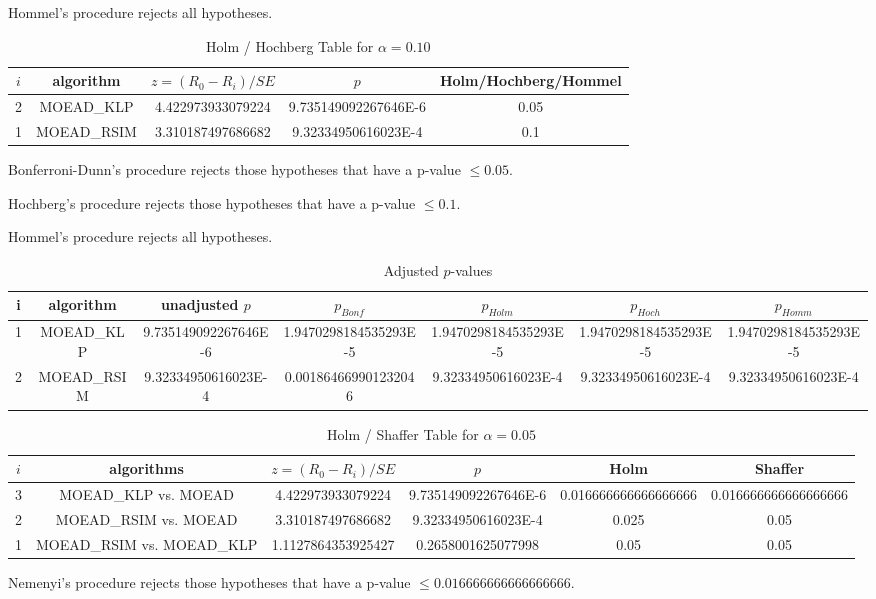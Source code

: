 \documentclass[a4paper,10pt]{article}
\begin{document}
\begin{landscape}
Hommel's procedure rejects all hypotheses.


\begin{table}[!htp]
\centering\tiny
\caption{Holm / Hochberg Table for $\alpha=0.10$}
\begin{tabular}{ccccc}
$i$&algorithm&$z=(R_0 - R_i)/SE$&$p$&Holm/Hochberg/Hommel\\
\hline
2&MOEAD_KLP&4.422973933079224&9.735149092267646E-6&0.05\\
1&MOEAD_RSIM&3.310187497686682&9.32334950616023E-4&0.1\\
\hline
\end{tabular}
\end{table}
Bonferroni-Dunn's procedure rejects those hypotheses that have a p-value $\le0.05$.


Hochberg's procedure rejects those hypotheses that have a p-value $\le0.1$.


Hommel's procedure rejects all hypotheses.


\begin{table}[!htp]
\centering\tiny
\caption{Adjusted $p$-values}
\begin{tabular}{ccccccc}
i&algorithm&unadjusted $p$&$p_{Bonf}$&$p_{Holm}$&$p_{Hoch}$&$p_{Homm}$\\
\hline
1&MOEAD_KLP&9.735149092267646E-6&1.9470298184535293E-5&1.9470298184535293E-5&1.9470298184535293E-5&1.9470298184535293E-5\\
2&MOEAD_RSIM&9.32334950616023E-4&0.001864669901232046&9.32334950616023E-4&9.32334950616023E-4&9.32334950616023E-4\\
\hline
\end{tabular}
\end{table}

\begin{table}[!htp]
\centering\tiny
\caption{Holm / Shaffer Table for $\alpha=0.05$}
\begin{tabular}{cccccc}
$i$&algorithms&$z=(R_0 - R_i)/SE$&$p$&Holm&Shaffer\\
\hline
3&MOEAD_KLP vs. MOEAD&4.422973933079224&9.735149092267646E-6&0.016666666666666666&0.016666666666666666\\
2&MOEAD_RSIM vs. MOEAD&3.310187497686682&9.32334950616023E-4&0.025&0.05\\
1&MOEAD_RSIM vs. MOEAD_KLP&1.1127864353925427&0.2658001625077998&0.05&0.05\\
\hline
\end{tabular}
\end{table}
Nemenyi's procedure rejects those hypotheses that have a p-value $\le0.016666666666666666$.



\end{landscape}
\end{document}
